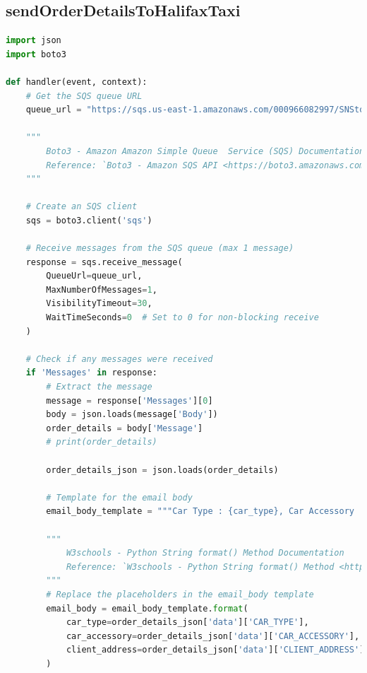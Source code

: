 \begin{enumerate}
\subsection{sendOrderDetailsToHalifaxTaxi}



\begin{mdframed}[linewidth=1pt]
\lstset{style=mystyle}
\begin{lstlisting}[language=Python]
import json
import boto3

def handler(event, context):
    # Get the SQS queue URL
    queue_url = "https://sqs.us-east-1.amazonaws.com/000966082997/SNStoHalifaxTaxiQueue"

    """
        Boto3 - Amazon Amazon Simple Queue  Service (SQS) Documentation
        Reference: `Boto3 - Amazon SQS API <https://boto3.amazonaws.com/v1/documentation/api/latest/reference/services/sqs.html>`_
    """

    # Create an SQS client
    sqs = boto3.client('sqs')

    # Receive messages from the SQS queue (max 1 message)
    response = sqs.receive_message(
        QueueUrl=queue_url,
        MaxNumberOfMessages=1,
        VisibilityTimeout=30, 
        WaitTimeSeconds=0  # Set to 0 for non-blocking receive
    )

    # Check if any messages were received
    if 'Messages' in response:
        # Extract the message
        message = response['Messages'][0]
        body = json.loads(message['Body'])
        order_details = body['Message']
        # print(order_details)
        
        order_details_json = json.loads(order_details)
        
        # Template for the email body
        email_body_template = """Car Type : {car_type}, Car Accessory : {car_accessory}, Client Address : {client_address}"""

        """
            W3schools - Python String format() Method Documentation
            Reference: `W3schools - Python String format() Method <https://www.w3schools.com/python/ref_string_format.asp>`_
        """
        # Replace the placeholders in the email_body template
        email_body = email_body_template.format(
            car_type=order_details_json['data']['CAR_TYPE'],
            car_accessory=order_details_json['data']['CAR_ACCESSORY'],
            client_address=order_details_json['data']['CLIENT_ADDRESS']
        )


\end{lstlisting}
\end{mdframed}
\end{enumerate}
